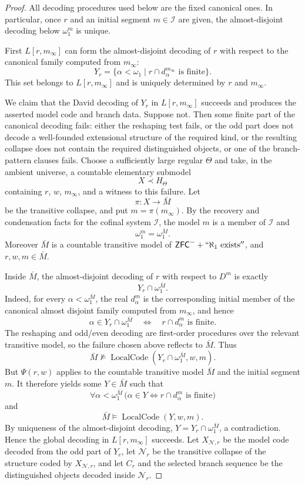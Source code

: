\documentclass[a4paper,11pt]{article}
\newcommand{\ZFC}{\mathsf{ZFC}}
\begin{document}
\begin{proof}
All decoding procedures used below are the fixed canonical ones.  In particular, once $r$ and an initial segment $m\in\mathcal I$ are given, the almost-disjoint decoding below $\omega_1^m$ is unique.

First $L[r,m_\infty]$ can form the almost-disjoint decoding of $r$ with respect to the canonical family computed from $m_\infty$:
\[
   Y_r=\{\alpha<\omega_1\mid r\cap d^{m_\infty}_\alpha
      \text{ is finite}\}.
\]
This set belongs to $L[r,m_\infty]$ and is uniquely determined by $r$ and $m_\infty$.

We claim that the David decoding of $Y_r$ in $L[r,m_\infty]$ succeeds and produces the asserted model code and branch data.  Suppose not.  Then some finite part of the canonical decoding fails: either the reshaping test fails, or the odd part does not decode a well-founded extensional structure of the required kind, or the resulting collapse does not contain the required distinguished objects, or one of the branch-pattern clauses fails.  Choose a sufficiently large regular $\Theta$ and take, in the ambient universe, a countable elementary submodel
\[
   X\prec H_\Theta
\]
containing $r$, $w$, $m_\infty$, and a witness to this failure.  Let
\[
   \pi:X\longrightarrow \bar M
\]
be the transitive collapse, and put $m=\pi(m_\infty)$.  By the recovery and condensation facts for the cofinal system $\mathcal I$, the model $m$ is a member of $\mathcal I$ and
\[
   \omega_1^m=\omega_1^{\bar M}.
\]
Moreover $\bar M$ is a countable transitive model of
$\ZFC^-+``\aleph_1\text{ exists}''$, and $r,w,m\in\bar M$.

Inside $\bar M$, the almost-disjoint decoding of $r$ with respect to $D^m$ is exactly
\[
   Y_r\cap\omega_1^{\bar M}.
\]
Indeed, for every $\alpha<\omega_1^{\bar M}$, the real $d^m_\alpha$ is the corresponding initial member of the canonical almost disjoint family computed from $m_\infty$, and hence
\[
   \alpha\in Y_r\cap\omega_1^{\bar M}
   \quad\Longleftrightarrow\quad
   r\cap d^m_\alpha\text{ is finite}.
\]
The reshaping and odd/even decoding are first-order procedures over the relevant transitive model, so the failure chosen above reflects to $\bar M$.  Thus
\[
   \bar M\not\models
      \operatorname{LocalCode}(Y_r\cap\omega_1^{\bar M},w,m).
\]
But $\Psi(r,w)$ applies to the countable transitive model $\bar M$ and the initial segment $m$.  It therefore yields some $Y\in\bar M$ such that
\[
   \forall\alpha<\omega_1^{\bar M}\,
   \bigl(\alpha\in Y\Longleftrightarrow r\cap d^m_\alpha
      \text{ is finite}\bigr)
\]
and
\[
   \bar M\models\operatorname{LocalCode}(Y,w,m).
\]
By uniqueness of the almost-disjoint decoding, $Y=Y_r\cap\omega_1^{\bar M}$, a contradiction.  Hence the global decoding in $L[r,m_\infty]$ succeeds.  Let $X_{\mathcal N,r}$ be the model code decoded from the odd part of $Y_r$, let $\mathcal N_r$ be the transitive collapse of the structure coded by $X_{\mathcal N,r}$, and let $C_r$ and the selected branch sequence be the distinguished objects decoded inside $\mathcal N_r$.


\end{proof}
\end{document}
